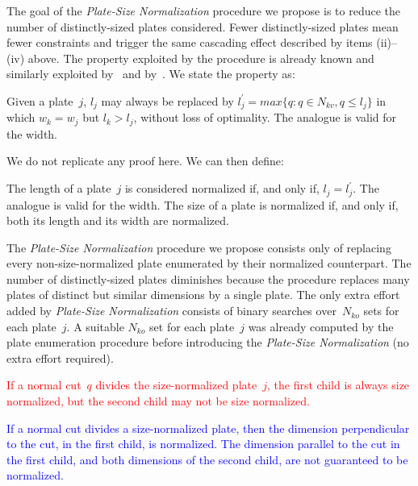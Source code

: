 \documentclass[smallextended]{svjour3}       %
\newif\iffinalversion
\newcommand{\newtext}[1]{\iffinalversion%
#1%
\else%
\textcolor{blue}{#1}%
\fi%
}
\newcommand{\oldtext}[1]{\iffinalversion%
#1%
\else%
\textcolor{red}{#1}%
\fi%
}
\begin{document}
The goal of the \emph{Plate-Size Normalization} procedure we propose is to reduce the number of distinctly-sized plates considered.
Fewer distinctly-sized plates mean fewer constraints and trigger the same cascading effect described by items (ii)--(iv) above.
The property exploited by the procedure is already known and similarly exploited by~\cite{alvarez:2009} and by~\cite{dolatabadi:2012}.
We state the property as:

\begin{proposition}
\label{pro:normalization}
Given a plate~\(j\), \(l_j\) may always be replaced by \(l^\prime_j = max\{q : q \in N_{kv}, q \leq l_j\}\) in which \(w_k = w_j\) but \(l_k > l_j\), without loss of optimality.
The analogue is valid for the width.
\end{proposition}

We do not replicate any proof here. We can then define:

\begin{definition}
The length of a plate~\(j\) is considered normalized if, and only if, \(l_j = l^\prime_j\).
The analogue is valid for the width.
The size of a plate is normalized if, and only if, both its length and its width are normalized.
\end{definition}

The \emph{Plate-Size Normalization} procedure we propose consists only of replacing every non-size-normalized plate enumerated by their normalized counterpart.
The number of distinctly-sized plates diminishes because the procedure replaces many plates of distinct but similar dimensions by a single plate.
The only extra effort added by \emph{Plate-Size Normalization} consists of binary searches over~\(N_{ko}\) sets for each plate~\(j\).
A suitable \(N_{ko}\) set for each plate~\(j\) was already computed by the plate enumeration procedure before introducing the \emph{Plate-Size Normalization} (no extra effort required).

\begin{remark}
\oldtext{If a normal cut~\(q\) divides the size-normalized plate~\(j\), the first child is always size normalized, but the second child may not be size normalized.}
\newtext{If a normal cut divides a size-normalized plate, then the dimension perpendicular to the cut, in the first child, is normalized. The dimension parallel to the cut in the first child, and both dimensions of the second child, are not guaranteed to be normalized.}
\end{remark}
\end{document}
